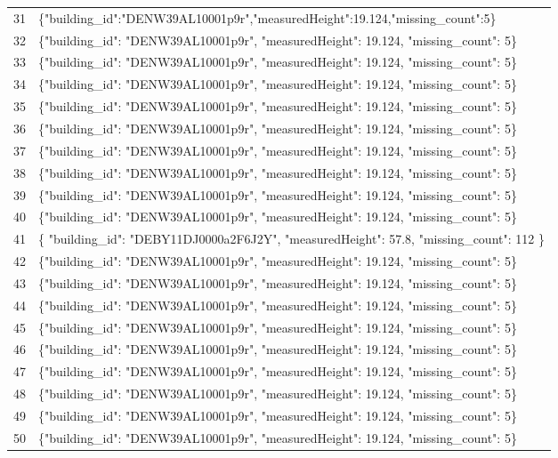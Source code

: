 \documentclass[a4paper,11pt]{article}
\begin{document}
\begin{table}[ht]
\begin{tabular}{r p{12cm}}
31 & \{"building\_id":"DENW39AL10001p9r","measuredHeight":19.124,"missing\_count":5\} \\
32 & \{"building\_id": "DENW39AL10001p9r", "measuredHeight": 19.124, "missing\_count": 5\} \\
33 & \{"building\_id": "DENW39AL10001p9r", "measuredHeight": 19.124, "missing\_count": 5\} \\
34 & \{"building\_id": "DENW39AL10001p9r", "measuredHeight": 19.124, "missing\_count": 5\} \\
35 & \{"building\_id": "DENW39AL10001p9r", "measuredHeight": 19.124, "missing\_count": 5\} \\
36 & \{"building\_id": "DENW39AL10001p9r", "measuredHeight": 19.124, "missing\_count": 5\} \\
37 & \{"building\_id": "DENW39AL10001p9r", "measuredHeight": 19.124, "missing\_count": 5\} \\
38 & \{"building\_id": "DENW39AL10001p9r", "measuredHeight": 19.124, "missing\_count": 5\} \\
39 & \{"building\_id": "DENW39AL10001p9r", "measuredHeight": 19.124, "missing\_count": 5\} \\
40 & \{"building\_id": "DENW39AL10001p9r", "measuredHeight": 19.124, "missing\_count": 5\} \\
41 & \{
  "building\_id": "DEBY11DJ0000a2F6J2Y",
  "measuredHeight": 57.8,
  "missing\_count": 112
\} \\
42 & \{"building\_id": "DENW39AL10001p9r", "measuredHeight": 19.124, "missing\_count": 5\} \\
43 & \{"building\_id": "DENW39AL10001p9r", "measuredHeight": 19.124, "missing\_count": 5\} \\
44 & \{"building\_id": "DENW39AL10001p9r", "measuredHeight": 19.124, "missing\_count": 5\} \\
45 & \{"building\_id": "DENW39AL10001p9r", "measuredHeight": 19.124, "missing\_count": 5\} \\
46 & \{"building\_id": "DENW39AL10001p9r", "measuredHeight": 19.124, "missing\_count": 5\} \\
47 & \{"building\_id": "DENW39AL10001p9r", "measuredHeight": 19.124, "missing\_count": 5\} \\
48 & \{"building\_id": "DENW39AL10001p9r", "measuredHeight": 19.124, "missing\_count": 5\} \\
49 & \{"building\_id": "DENW39AL10001p9r", "measuredHeight": 19.124, "missing\_count": 5\} \\
50 & \{"building\_id": "DENW39AL10001p9r", "measuredHeight": 19.124, "missing\_count": 5\} \\

\end{tabular}
\end{table}
\end{document}

